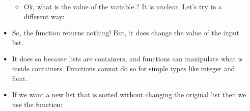 \documentclass[letterpaper,10pt,english]{sphinxmanual}
\begin{document}
\begin{itemize}
\begin{sphinxVerbatim}[commandchars=\\\{\}]
  \PYG{p}{[}      \PYG{p}{]}
  
\end{sphinxVerbatim}
\begin{itemize}
\item {} 
Ok, what is the value of the variable ? It is
unclear. Let’s try in a different way:

\end{itemize}

\begin{sphinxVerbatim}[commandchars=\\\{\}]
\end{sphinxVerbatim}

\item {} 
So, the function returns nothing! But, it does change the value of
the input list.

\item {} 
It does so because lists are containers, and functions can
manipulate what is inside containers. Functions cannot do so for simple
types like integer and float.

\item {} 
If we want a new list that is sorted without changing the original list
then we use the  function:

\begin{sphinxVerbatim}[commandchars=\\\{\}]
  \PYG{p}{[}      \PYG{p}{]}
  
\end{sphinxVerbatim}

\end{itemize}
\end{document}
